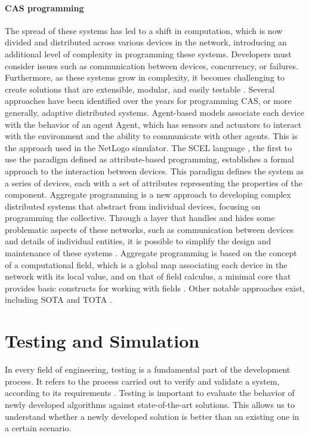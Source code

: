 \documentclass[12pt,a4paper,openright,twoside]{book}
\begin{document}
\paragraph*{CAS programming}
The spread of these systems has led to a shift in computation, which is now divided and distributed across various devices in the network, introducing an additional level of complexity in programming these systems.
Developers must consider issues such as communication between devices, concurrency, or failures. 
Furthermore, as these systems grow in complexity, it becomes challenging to create solutions that are extensible, modular, and easily testable \cite{DBLP:conf/ecoop/CasadeiV16}.
Several approaches have been identified over the years for programming CAS, or more generally, adaptive distributed systems.
Agent-based models \cite{MacalN10} associate each device with the behavior of an agent \cite{RussellN95} Agent, which has sensors and actuators to interact with the environment and the ability to communicate with other agents. 
This is the approach used in the NetLogo simulator.
The SCEL language \cite{NicolaLPT14}, the first to use the paradigm defined as attribute-based programming, establishes a formal approach to the interaction between devices. 
This paradigm defines the system as a series of devices, each with a set of attributes representing the properties of the component.
Aggregate programming is a new approach to developing complex distributed systems that abstract from individual devices, focusing on programming the collective.
Through a layer that handles and hides some problematic aspects of these networks, such as communication between devices and details of individual entities,
it is possible to simplify the design and maintenance of these systems \cite{DBLP:journals/computer/BealPV15, DBLP:conf/sfm/BealV16}.
Aggregate programming is based on the concept of a computational field, which is a global map associating each device in the network with its local value,
and on that of field calculus, a minimal core that provides basic constructs for working with fields \cite{DBLP:journals/corr/ViroliADPB16}.
Other notable approaches exist, including SOTA \cite{AbeywickramaBMZ20} and TOTA \cite{MameiVZ04}. 

\section{Testing and Simulation}

In every field of engineering, testing is a fundamental part of the development process. 
It refers to the process carried out to verify and validate a system, according to its requirements \cite{Spillner2011}.
Testing is important to evaluate the behavior of newly developed algorithms against state-of-the-art solutions.
This allows us to understand whether a newly developed solution is better than an existing one in a certain scenario. \\
\end{document}
